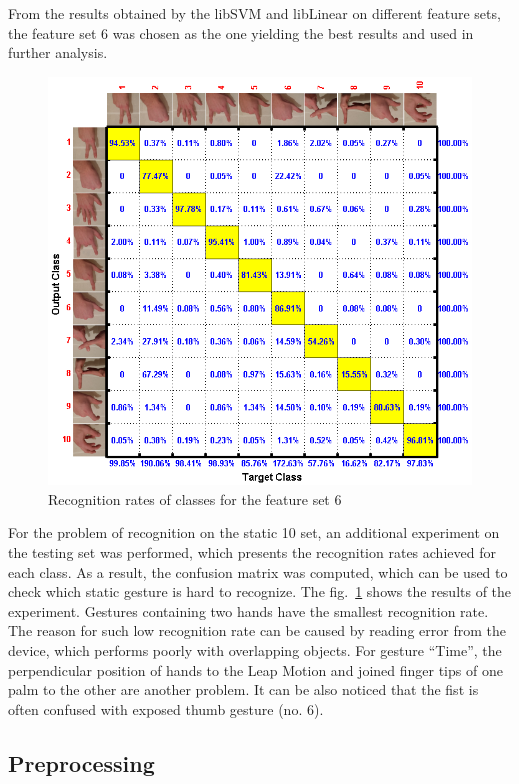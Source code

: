 From the results obtained by the libSVM and libLinear on different feature sets, the feature set $6$ was chosen as the one yielding the best results and used in further analysis.

\begin{figure}[htb]
\centering
 \includegraphics[width=0.8\columnwidth]{figures/staticClassesRecognitionRates.png}
 \caption{Recognition rates of classes for the feature set $6$}
 \label{staticClassesRecognitionRates}
\end{figure}

For the problem of recognition on the static 10 set, an additional experiment on the testing set was performed, which presents the recognition rates achieved for each class. 
As a result, the confusion matrix was computed, which can be used to check which static gesture is hard to recognize. The fig.~\ref{staticClassesRecognitionRates} shows the results of the experiment. 
Gestures containing two hands have the smallest recognition rate. 
The reason for such low recognition rate can be caused by reading error from the device, which performs poorly with overlapping objects. 
For gesture ``Time'', the perpendicular position of hands to the Leap Motion and joined finger tips of one palm to the other are another problem. It can be also noticed that the fist is often confused with exposed thumb gesture (no. $6$).

\subsection{Preprocessing}

